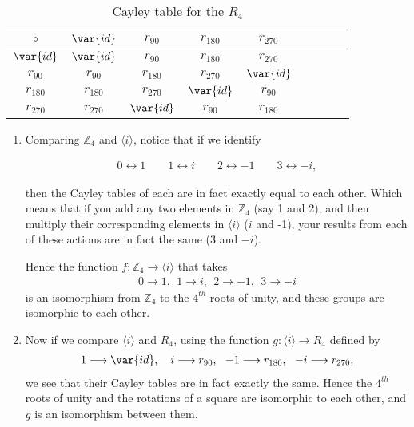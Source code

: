 \begin{example}
\begin{table}[H]
{\begin{center}
\begin{tabular}{c|cccccccc}
\end{tabular}
\end{center}
}
\end{table}

\begin{table}[H]
\caption{Cayley table for the $R_4$}
\label{4_rotations_table}
{\small
\begin{center}
\begin{tabular}{c|cccccccc}
$\circ$ & $\var{id}$ & $r_{90}$ & $r_{180}$ & $r_{270}$  \\
\hline
$\var{id}$        & $\var{id}$ & $r_{90}$ & $r_{180}$ & $r_{270}$  \\
$r_{90}$       & $r_{90}$ & $r_{180}$ & $r_{270}$ & $\var{id}$  \\
$r_{180}$       & $r_{180}$ & $r_{270}$ & $\var{id}$ & $r_{90}$ \\
$r_{270}$       & $r_{270}$ & $\var{id}$ & $r_{90}$ & $r_{180}$ \\

\end{tabular}
\end{center}
}
\end{table}

\begin{enumerate}[(1)]
\item
Comparing ${\mathbb Z_4}$ and $\langle i \rangle$, notice that if we identify 

\begin{align*}
  0 \leftrightarrow 1 \qquad
    1 \leftrightarrow i \qquad
    2 \leftrightarrow -1 \qquad
    3 \leftrightarrow -i, 
\end{align*}
    
then the Cayley tables of each are in fact exactly equal to each other.  Which means that if you add any two elements in ${\mathbb Z_4}$ (say 1 and 2), and then multiply their corresponding elements in $\langle i \rangle$ ($i$ and -1), your results from each of these actions are in fact the same (3 and $-i$).

Hence the function $f: {\mathbb Z_4} \longrightarrow \langle i \rangle$  that takes 
\begin{align*}
    0 \longrightarrow 1 ,~~     1 \longrightarrow i,~~    2 \longrightarrow -1,~~   3 \longrightarrow -i  
\end{align*}
 is an isomorphism from ${\mathbb Z_4}$ to the $4^{th}$ roots of unity, and these groups are isomorphic to each other.

\item
Now if we compare $\langle i \rangle$ and $R_4$, using the function  $g: \langle i \rangle \longrightarrow R_4$  defined by
\begin{align*}
1 \longrightarrow \var{id}, ~~\
i \longrightarrow  r_{90},~~
-1 \longrightarrow r_{180},~~
 -i \longrightarrow r_{270}, 
\end{align*}
we see that their Cayley tables are in fact exactly the same.  Hence the $4^{th}$ roots of unity and the rotations of a square are isomorphic to each other, and $g$ is an isomorphism between them.  


\end{enumerate}
\end{example}
